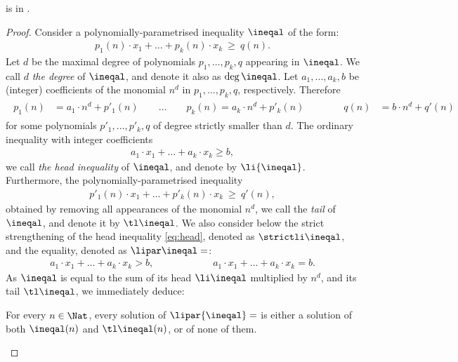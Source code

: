 \begin{theorem} \label{thm:polyptime}
\allpolyineqsolvname is %
in \PTIME.
\end{theorem}
%
\begin{proof}
Consider a polynomially-parametrised 
inequality $\ineqal$ of the form:
%
\begin{align} \label{eq:polyeqpowt}
p_1(n) \cdot x_1 + \ldots + p_k(n) \cdot x_k \ \geq \ q(n).
\end{align}
%
Let $d$  be the maximal degree of polynomials $p_1, \ldots, p_k, q$ appearing
in $\ineqal$.
We call $d$ \emph{the degree} of $\ineqal$, and denote it also as $\deg \ineqal$.
Let $a_1, \ldots, a_k, b$ be (integer) coefficients of the monomial $n^{d}$ in 
$p_1,  \ldots, p_k, q$,
respectively.
Therefore
\begin{align} \label{eq:d}
\begin{aligned}
p_1(n) & = a_1 \cdot n^{d} + p'_1(n) \qquad \ldots \qquad 
p_k(n) = a_k \cdot n^{d} + p'_k(n) \qquad\qquad
q(n) & = b \cdot n^{d} + q'(n)
\end{aligned}
\end{align}
for some polynomials $p'_1, \ldots, p'_k, q$ of degree strictly smaller than $d$.
The ordinary inequality with integer coefficients
\begin{align} \label{eq:head}
a_1 \cdot x_1 + \ldots + a_k \cdot x_k \geq b,
\end{align}
we call \emph{the head inequality} of $\ineqal$, and denote by
$\li{\ineqal}$.
Furthermore, the polynomially-parametrised inequality 
\begin{align} \label{eq:tl}
p'_1(n) \cdot x_1 + \ldots + p'_k(n) \cdot x_k \ \geq \ q'(n),
\end{align}
obtained by removing all appearances of the monomial $n^d$,
we call the \emph{tail} of $\ineqal$, and denote it by $\tl \ineqal$.
We also consider below the strict strengthening of the head inequality \eqref{eq:head}, denoted as $\strictli \ineqal$, and the equality, denoted as $\lipar \ineqal =$:
\begin{align} \label{eq:strictli}
%
a_1 \cdot x_1 + \ldots + a_k \cdot x_k > b,
\qquad\qquad\qquad
a_1 \cdot x_1 + \ldots + a_k \cdot x_k = b.
\end{align}
%
%
As $\ineqal$ is equal to the sum of its head $\li \ineqal$ multiplied by $n^d$, 
and its tail $\tl \ineqal$, we immediately deduce:
%
\begin{claim} \label{claim:hdtl}
For every $n\in\Nat$, every solution of $\lipar {\ineqal} =$ is either a solution of both $\ineqal(n)$ and 
${\tl \ineqal}(n)$, 
or of none of them.
\end{claim}


\end{proof}
